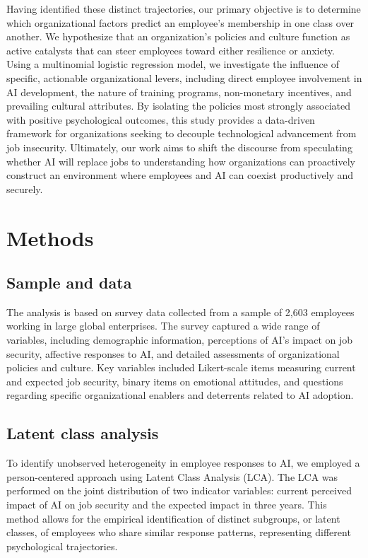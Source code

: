 \documentclass[]{article}
\begin{document}
Having identified these distinct trajectories, our primary objective is to determine which organizational factors predict an employee's membership in one class over another. We hypothesize that an organization's policies and culture function as active catalysts that can steer employees toward either resilience or anxiety. Using a multinomial logistic regression model, we investigate the influence of specific, actionable organizational levers, including direct employee involvement in AI development, the nature of training programs, non-monetary incentives, and prevailing cultural attributes. By isolating the policies most strongly associated with positive psychological outcomes, this study provides a data-driven framework for organizations seeking to decouple technological advancement from job insecurity. Ultimately, our work aims to shift the discourse from speculating whether AI will replace jobs to understanding how organizations can proactively construct an environment where employees and AI can coexist productively and securely.

\section{Methods}
\label{sec:methods}
\subsection{Sample and data}
The analysis is based on survey data collected from a sample of 2,603 employees working in large global enterprises. The survey captured a wide range of variables, including demographic information, perceptions of AI's impact on job security, affective responses to AI, and detailed assessments of organizational policies and culture. Key variables included Likert-scale items measuring current and expected job security, binary items on emotional attitudes, and questions regarding specific organizational enablers and deterrents related to AI adoption.

\subsection{Latent class analysis}
To identify unobserved heterogeneity in employee responses to AI, we employed a person-centered approach using Latent Class Analysis (LCA). The LCA was performed on the joint distribution of two indicator variables: current perceived impact of AI on job security and the expected impact in three years. This method allows for the empirical identification of distinct subgroups, or latent classes, of employees who share similar response patterns, representing different psychological trajectories.
\end{document}
